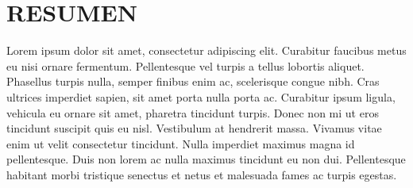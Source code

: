 \chapter*{RESUMEN}

Lorem ipsum dolor sit amet, consectetur adipiscing elit. Curabitur faucibus metus eu nisi ornare fermentum. Pellentesque vel turpis a tellus lobortis aliquet. Phasellus turpis nulla, semper finibus enim ac, scelerisque congue nibh. Cras ultrices imperdiet sapien, sit amet porta nulla porta ac. Curabitur ipsum ligula, vehicula eu ornare sit amet, pharetra tincidunt turpis. Donec non mi ut eros tincidunt suscipit quis eu nisl. Vestibulum at hendrerit massa. Vivamus vitae enim ut velit consectetur tincidunt. Nulla imperdiet maximus magna id pellentesque. Duis non lorem ac nulla maximus tincidunt eu non dui. Pellentesque habitant morbi tristique senectus et netus et malesuada fames ac turpis egestas.